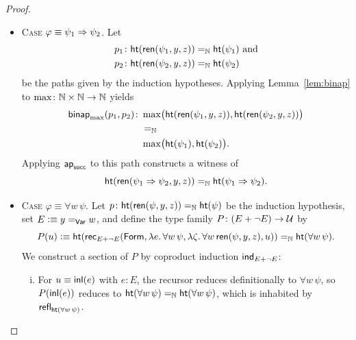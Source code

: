 \begin{proof}
\begin{itemize}
        \item \textsc{Case} $\varphi\equiv\psi_1\mathrel{\Rightarrow}\psi_2$. Let
        \begin{align*}
            p_1&\colon\fun{ht}(\fun{ren}(\psi_1,y,z))
                \eq\N\fun{ht}(\psi_1)
            \text{ and}\\
            p_2&\colon\fun{ht}(\fun{ren}(\psi_2,y,z))
                \eq\N\fun{ht}(\psi_2)
        \end{align*}
        be the paths given by the induction hypotheses. Applying Lemma~\ref{lem:binap} to $\max\colon\N\times\N\to\N$ yields
        \begin{align*}
            \fun{binap}_{\max}(p_1,p_2)\colon
                &\max\bigl(
                    \fun{ht}(\fun{ren}(\psi_1,y,z)),
                    \fun{ht}(\fun{ren}(\psi_2,y,z))
                \bigr)\\
                &\eq\N\\
                &\max\bigl(
                    \fun{ht}(\psi_1),\fun{ht}(\psi_2)
                \bigr).
        \end{align*}
        Applying $\mathsf{ap}_{\mathsf{succ}}$ to this path constructs a witness of
        \[
            \mathsf{ht}(
                \mathsf{ren}(\psi_1\mathrel{\Rightarrow}\psi_2,y,z)
            )
            \mathrel{=_{\mathbb{N}}}
            \mathsf{ht}(\psi_1\mathrel{\Rightarrow}\psi_2).
        \]
        
        \item \textsc{Case} $\varphi\equiv\forall w\,\psi$. Let $p\colon\fun{ht}(\fun{ren}(\psi,y,z))\eq\N\fun{ht}(\psi)$ be the induction hypothesis, set $E\mathrel{\vcentcolon}\equiv y\mathrel{=_{\mathsf{Var}}}w$, and define the type family $P\colon(E+\neg E)\to\univ$ by
        \[
            P(u)\mathrel{\vcentcolon}\equiv
                \mathsf{ht}(
                    \mathsf{rec}_{E+\neg E}(
                        \mathsf{Form},
                        \lambda e.\,\forall w\,\psi,
                        \lambda\zeta.\,
                            \forall w\,\mathsf{ren}(\psi,y,z),u
                    )
                )
                \mathrel{=_{\mathbb{N}}}
                \mathsf{ht}(\forall w\,\psi).
        \]
        We construct a section of $P$ by coproduct induction $\mathsf{ind}_{E+\neg E}$:
        \begin{enumerate}[i)]
            \item For $u\equiv\mathsf{inl}(e)$ with $e\colon E$, the recursor reduces definitionally to $\forall w\,\psi$, so $P(\mathsf{inl}(e))$ reduces to $\mathsf{ht}(\forall w\,\psi)\mathrel{=_{\mathbb{N}}}\mathsf{ht}(\forall w\,\psi)$, which is inhabited by $\mathsf{refl}_{\mathsf{ht}(\forall w\,\psi)}$.
            

\end{enumerate}
\end{itemize}
\end{proof}
